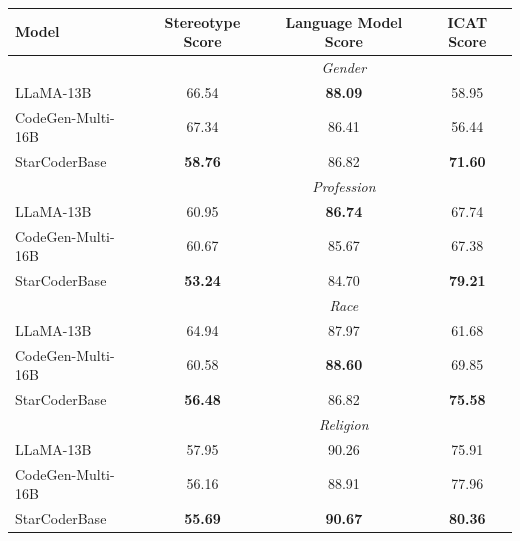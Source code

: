 \documentclass[10pt]{article} %
\begin{document}
\begin{table}[t]
    \centering
    \begin{tabular}{lccc}
        \toprule
        \textbf{Model} & \textbf{Stereotype Score} & \textbf{Language Model Score} & \textbf{ICAT Score} \\
        \midrule
        & & \emph{Gender} \\
        \midrule
        LLaMA-13B & 66.54 & \textbf{88.09} & 58.95 \\
        CodeGen-Multi-16B & 67.34 & 86.41 & 56.44 \\
        StarCoderBase & \textbf{58.76} & 86.82 & \textbf{71.60} \\
        \midrule
        & & \emph{Profession} \\
        \midrule
        LLaMA-13B & 60.95 & \textbf{86.74} & 67.74 \\
        CodeGen-Multi-16B & 60.67 & 85.67 & 67.38 \\
        StarCoderBase & \textbf{53.24} & 84.70 & \textbf{79.21} \\
        \midrule
        & & \emph{Race} \\
        \midrule
        LLaMA-13B & 64.94 & 87.97 & 61.68 \\
        CodeGen-Multi-16B & 60.58 & \textbf{88.60} & 69.85 \\
        StarCoderBase & \textbf{56.48} & 86.82 & \textbf{75.58} \\
        \midrule
        & & \emph{Religion} \\
        \midrule
        LLaMA-13B & 57.95 & 90.26 & 75.91 \\
        CodeGen-Multi-16B & 56.16 & 88.91 & 77.96 \\
        StarCoderBase & \textbf{55.69} & \textbf{90.67} & \textbf{80.36} \\

\end{tabular}
\end{table}
\end{document}
